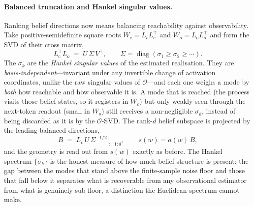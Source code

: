 \documentclass[11pt]{article}
\begin{document}
\paragraph{Balanced truncation and Hankel singular values.}
Ranking belief directions now means balancing reachability against observability. Take
positive-semidefinite square roots $W_c=L_cL_c^{\!\top}$ and $W_o=L_oL_o^{\!\top}$ and form
the SVD of their cross matrix,
\begin{equation}
L_c^{\!\top}L_o \;=\; U\,\Sigma\,V^{\!\top},
\qquad \Sigma=\operatorname{diag}(\sigma_1\ge\sigma_2\ge\cdots).
\label{eq:balanced}
\end{equation}
The $\sigma_k$ are the \emph{Hankel singular values} of the estimated realisation. They are
\emph{basis-independent}---invariant under any invertible change of activation coordinates,
unlike the raw singular values of $\mathcal{O}$---and each one weighs a mode by \emph{both}
how reachable and how observable it is. A mode that is reached (the process visits those
belief states, so it registers in $W_c$) but only weakly seen through the next-token readout
(small in $W_o$) still receives a non-negligible $\sigma_k$, instead of being discarded as it
is by the $\mathcal{O}$-SVD. The rank-$d$ belief subspace is projected by the leading balanced
directions,
\begin{equation}
B \;=\; L_c\,U\,\Sigma^{-1/2}\big|_{:,\,1:d},
\qquad s(w)=\widetilde a(w)\,B,
\label{eq:balanced-basis}
\end{equation}
and the geometry is read out from $s(w)$ exactly as before. The Hankel spectrum
$\{\sigma_k\}$ is the honest measure of how much belief structure is present: the gap between
the modes that stand above the finite-sample noise floor and those that fall below it
separates what is recoverable from any observational estimator from what is genuinely
sub-floor, a distinction the Euclidean spectrum cannot make.
\end{document}
